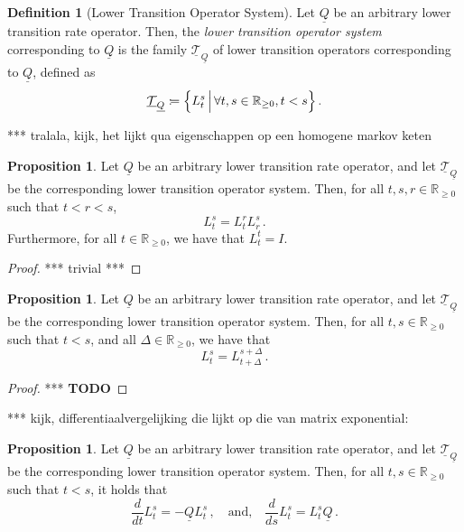 \documentclass[10pt]{paper}
\theoremstyle{definition}
\newtheorem{proposition}[theorem]{Proposition}
\newtheorem{definition}{Definition}
\newcommand{\reals}{\mathbb{R}}
\newcommand{\realsnonneg}{\reals_{\geq 0}}
\newcommand{\lbound}{L}
\newcommand{\lrate}{\underline{Q}}
\newcommand{\coloneqq}{:\!=}
\begin{document}
\begin{definition}[Lower Transition Operator System]
Let $\lrate$ be an arbitrary lower transition rate operator. Then, the \emph{lower transition operator system} corresponding to $\lrate$ is the family $\underline{\mathcal{T}}_{\lrate}$ of lower transition operators corresponding to $\lrate$, defined as
\begin{equation*}
\underline{\mathcal{T}}_{\lrate} \coloneqq \Bigl\{L_t^s\,\Big\vert\,\forall t,s\in\realsnonneg, t<s\Bigr\}\,.
\end{equation*}
\end{definition}

*** tralala, kijk, het lijkt qua eigenschappen op een homogene markov keten

\begin{proposition}
Let $\lrate$ be an arbitrary lower transition rate operator, and let $\underline{\mathcal{T}}_{\lrate}$ be the corresponding lower transition operator system. Then, for all $t,s,r\in\realsnonneg$ such that $t< r<s$,
\begin{equation*}
L_t^s = L_t^rL_r^s\,.
\end{equation*}
Furthermore, for all $t\in\realsnonneg$, we have that $L_t^t=I$.
\end{proposition}
\begin{proof}
*** trivial ***
\end{proof}

\begin{proposition}\label{prop:lower_transition_is_homogeneous}
Let $\lrate$ be an arbitrary lower transition rate operator, and let $\underline{\mathcal{T}}_{\lrate}$ be the corresponding lower transition operator system. Then, for all $t,s\in\realsnonneg$ such that $t<s$, and all $\Delta\in\realsnonneg$, we have that
\begin{equation*}
L_t^s = L_{t+\Delta}^{s+\Delta}\,.
\end{equation*}
\end{proposition}
\begin{proof}
*** {\bf TODO}
\end{proof}

*** kijk, differentiaalvergelijking die lijkt op die van matrix exponential:

\begin{proposition}\label{prop:lower_transition_has_deriv}
Let $\lrate$ be an arbitrary lower transition rate operator, and let $\underline{\mathcal{T}}_{\lrate}$ be the corresponding lower transition operator system. Then, for all $t,s\in\realsnonneg$ such that $t<s$, it holds that
\begin{equation*}
\frac{d}{dt}\lbound_t^s=-\lrate\lbound_t^s\,,\quad\text{and,}\quad\frac{d}{ds}\lbound_t^s=\lbound_t^s\lrate\,.
\end{equation*}
\end{proposition}
\end{document}
